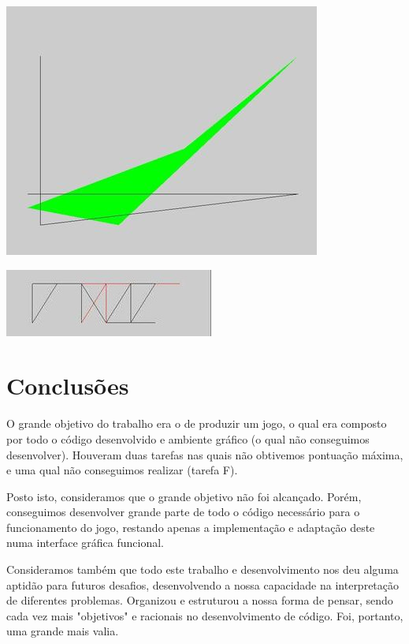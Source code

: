 \documentclass[a4paper]{article}
\begin{document}
\begin{center}
\includegraphics[scale=0.35]{2}
\end{center}


\begin{center}
\includegraphics{1}
\end{center}

\section{Conclusões}
\label{sec:conclusao}

O grande objetivo do trabalho era o de produzir um jogo, o qual era composto por todo o código desenvolvido e ambiente gráfico (o qual não conseguimos desenvolver). Houveram duas tarefas nas quais não obtivemos pontuação máxima, e uma qual não conseguimos realizar (tarefa F). \par
Posto isto, consideramos que o grande objetivo não foi alcançado. Porém, conseguimos desenvolver grande parte de todo o código necessário para o funcionamento do jogo, restando apenas a implementação e adaptação deste numa interface gráfica funcional. \par
Consideramos também que todo este trabalho e desenvolvimento nos deu alguma aptidão para futuros desafios, desenvolvendo a nossa capacidade na interpretação de diferentes problemas. Organizou e estruturou a nossa forma de pensar, sendo cada vez mais "objetivos" e racionais no desenvolvimento de código. Foi, portanto, uma grande mais valia.
\end{document}

